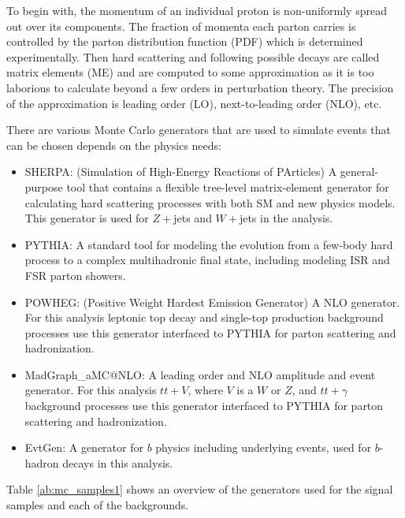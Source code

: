 To begin with, the momentum of an individual proton is non-uniformly spread out over its components.  The fraction of momenta each parton carries is controlled by the parton distribution function (PDF) which is determined experimentally.  Then hard scattering and following possible decays are called matrix elements (ME) and are computed to some approximation as it is too laborious to calculate beyond a few orders in perturbation theory.  The precision of the approximation is leading order (LO), next-to-leading order (NLO), etc. 

There are various Monte Carlo generators that are used to simulate events that can be chosen depends on the physics needs:

\begin{itemize}
	\item SHERPA\cite{sherpa}:  (Simulation of High-Energy Reactions of PArticles) A general-purpose tool that contains a flexible tree-level matrix-element generator for calculating hard scattering processes with both SM and new physics models.  This generator is used for $Z+$jets and $W+$jets in the analysis.
	\item PYTHIA\cite{pythia8}: A standard tool for modeling the evolution from a few-body hard process to a complex multihadronic final state, including modeling ISR and FSR parton showers.
	\item POWHEG\cite{powheg-box}: (Positive Weight Hardest Emission Generator) A NLO generator.  For this analysis leptonic top decay and single-top production background processes use this generator interfaced to PYTHIA for parton scattering and hadronization.  
	\item MadGraph\_aMC@NLO\cite{madgraph}: A leading order and NLO amplitude and event generator.  For this analysis $tt+V$, where $V$ is a $W$ or $Z$, and $tt+\gamma$ background processes use this generator interfaced to PYTHIA for parton scattering and hadronization.  
	\item EvtGen\cite{evtGen}: A generator for $b$ physics including underlying events, used for $b$-hadron decays in this analysis.
\end{itemize}

Table \ref{ab:mc_samples1} shows an overview of the generators used for the signal samples and each of the backgrounds. \\

